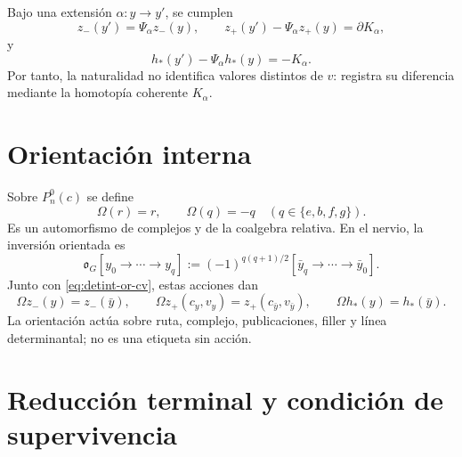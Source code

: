 Bajo una extensión \(\alpha:y\to y'\), se cumplen
\begin{equation}\label{eq:detint-z-natural}
 z_-(y')=\Psi_\alpha z_-(y),
 \qquad
 z_+(y')-\Psi_\alpha z_+(y)=\partial K_\alpha,
\end{equation}
y
\begin{equation}\label{eq:detint-h-natural}
 h_*(y')-\Psi_\alpha h_*(y)=-K_\alpha.
\end{equation}
Por tanto, la naturalidad no identifica valores distintos de \(v\): registra
su diferencia mediante la homotopía coherente \(K_\alpha\).

\section{Orientación interna}

Sobre \(P_n^0(c)\) se define
\begin{equation}\label{eq:detint-omega-p}
 \Omega(r)=r,
 \qquad
 \Omega(q)=-q\quad(q\in\{e,b,f,g\}).
\end{equation}
Es un automorfismo de complejos y de la coalgebra relativa. En el nervio,
la inversión orientada es
\begin{equation}\label{eq:detint-omega-g}
 \mathfrak o_G[y_0\to\cdots\to y_q]
 :=(-1)^{q(q+1)/2}
 [\bar y_q\to\cdots\to\bar y_0].
\end{equation}
Junto con \eqref{eq:detint-or-cv}, estas acciones dan
\begin{equation}\label{eq:detint-or-z-h}
 \Omega z_-(y)=z_-(\bar y),
 \qquad
 \Omega z_+(c_y,v_y)=z_+(c_{\bar y},v_{\bar y}),
 \qquad
 \Omega h_*(y)=h_*(\bar y).
\end{equation}
La orientación actúa sobre ruta, complejo, publicaciones, filler y línea
determinantal; no es una etiqueta sin acción.

\section{Reducción terminal y condición de supervivencia}
\label{sec:detint-terminal}

